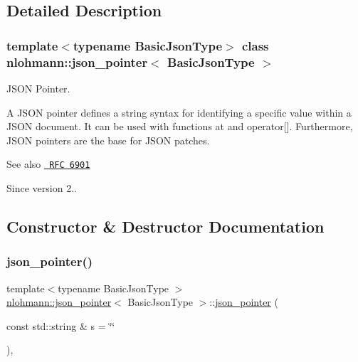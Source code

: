 \subsection{Detailed Description}
\subsubsection*{template$<$typename Basic\+Json\+Type$>$\newline
class nlohmann\+::json\+\_\+pointer$<$ Basic\+Json\+Type $>$}

J\+S\+ON Pointer. 

A J\+S\+ON pointer defines a string syntax for identifying a specific value within a J\+S\+ON document. It can be used with functions {\ttfamily at} and {\ttfamily operator\mbox{[}\mbox{]}}. Furthermore, J\+S\+ON pointers are the base for J\+S\+ON patches.

\begin{DoxySeeAlso}{See also}
\href{https://tools.ietf.org/html/rfc6901}{\texttt{ R\+FC 6901}}
\end{DoxySeeAlso}
\begin{DoxySince}{Since}
version 2.. 
\end{DoxySince}


\subsection{Constructor \& Destructor Documentation}
\mbox{\label{classnlohmann_1_1json__pointer_a7f32d7c62841f0c4a6784cf741a6e4f8}} 
\subsubsection{\texorpdfstring{json\_pointer()}{json\_pointer()}}
{\footnotesize\ttfamily template$<$typename Basic\+Json\+Type $>$ \\
\mbox{\hyperlink{classnlohmann_1_1json__pointer}{nlohmann\+::json\+\_\+pointer}}$<$ Basic\+Json\+Type $>$\+::\mbox{\hyperlink{classnlohmann_1_1json__pointer}{json\+\_\+pointer}} (\begin{DoxyParamCaption}\item[{const std\+::string \&}]{s = {\ttfamily \char`\"{}\char`\"{}} }\end{DoxyParamCaption})\hspace{0.3cm}{\ttfamily [inline]}, {\ttfamily [explicit]}}



